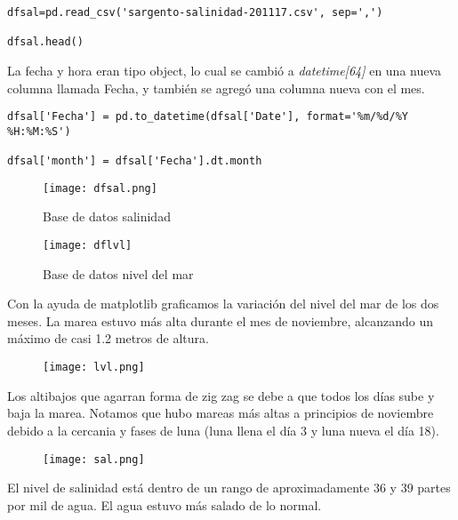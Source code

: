 \documentclass[12pt]{article}
\begin{document}
\begin{verbatim}
dfsal=pd.read_csv('sargento-salinidad-201117.csv', sep=',')

dfsal.head()
\end{verbatim}

La fecha y hora eran tipo object, lo cual se cambi\'o a \emph{datetime[64]} en una nueva columna llamada Fecha, y tambi\'en se agreg\'o una columna nueva con el mes.

\begin{verbatim}
dfsal['Fecha'] = pd.to_datetime(dfsal['Date'], format='%m/%d/%Y %H:%M:%S')

dfsal['month'] = dfsal['Fecha'].dt.month
\end{verbatim}


\begin{figure}[H]
   \begin{minipage}{0.6\textwidth}
     \centering
     \texttt{[image: dfsal.png]}
     \caption{Base de datos salinidad}
   \end{minipage}\hfill
   \begin {minipage}{0.6\textwidth}
     \centering
     \texttt{[image: dflvl]}
     \caption{Base de datos nivel del mar}
   \end{minipage}
\end{figure}

Con la ayuda de matplotlib graficamos la variaci\'on del nivel del mar de los dos meses. La marea estuvo m\'as alta durante el mes de noviembre, alcanzando un m\'aximo de casi 1.2 metros de altura. 
\begin{figure}[H]
\texttt{[image: lvl.png]}
\centering
\end{figure}
Los altibajos que agarran forma de zig zag se debe a que todos los d\'ias sube y baja la marea. Notamos que hubo mareas m\'as altas a principios de noviembre debido a la cercania y fases de luna (luna llena el d\'ia 3 y luna nueva el d\'ia 18). 
\begin{figure}[H]
\texttt{[image: sal.png]}
\centering
\end{figure}
El nivel de salinidad est\'a dentro de un rango de aproximadamente 36 y 39 partes por mil de agua. El agua estuvo m\'as salado de lo normal.
\end{document}
